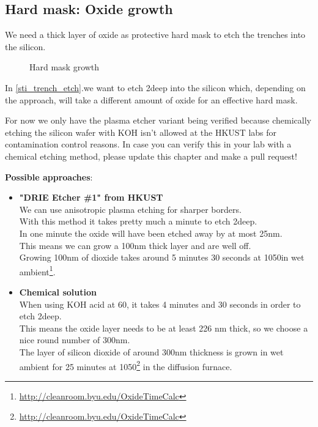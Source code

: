 \newpage

\subsection{Hard mask: Oxide growth}
We need a thick layer of oxide as protective hard mask to etch the trenches into the silicon.

\begin{figure}[H]
	\centering
	\begin{tikzpicture}[node distance = 3cm, auto, thick,scale=\CrossSectionOnly, every node/.style={transform shape}]
		
	\end{tikzpicture}
	\begin{tikzpicture}[node distance = 3cm, auto, thick,scale=\CrossSectionOnly, every node/.style={transform shape}]
		
	\end{tikzpicture}
	\caption{Hard mask growth}
\end{figure}

In \autoref{sti_trench_etch}.we want to etch 2\um deep into the silicon which, depending on the approach, will take a different amount of oxide for an effective hard mask. \\

\begin{mdframed}[linewidth=2pt,linecolor=red]
For now we only have the plasma etcher variant being verified because chemically etching the silicon wafer with KOH isn't allowed at the HKUST labs for contamination control reasons.
In case you can verify this in your lab with a chemical etching method, please update this chapter and make a pull request!
\end{mdframed}

\textbf{Possible approaches}:
\begin{itemize}
	\item \textbf{"DRIE Etcher \#1" from HKUST} \\
	We can use anisotropic plasma etching for sharper borders. \\
	With this method it takes pretty much a minute to etch 2\um deep. \\
	In one minute the oxide will have been etched away by at most 25nm. \\
	This means we can grow a 100nm thick layer and are well off. \\
	Growing 100nm of dioxide takes around 5 minutes 30 seconds at 1050\degreesC in wet ambient\footnote{\url{http://cleanroom.byu.edu/OxideTimeCalc}}.
	\item \textbf{Chemical solution} \\
	When using KOH acid at 60\degreesC,  it takes 4 minutes and 30 seconds in order to etch 2\um deep. \\
	This means the oxide layer needs to be at least 226 nm thick, so we choose a nice round number of 300nm. \\
	The layer of silicon dioxide of around 300nm thickness is grown in wet ambient for 25 minutes at 1050\degreesC\footnote{\url{http://cleanroom.byu.edu/OxideTimeCalc}} in the diffusion furnace.
\end{itemize}


